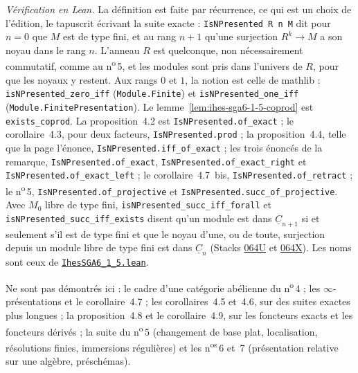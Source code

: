 \noindent\emph{Vérification en Lean.} La définition est faite par récurrence, ce qui est un choix de l'édition, le tapuscrit écrivant la suite exacte : \texttt{IsNPresented R n M} dit pour $n = 0$ que $M$ est de type fini, et au rang $n + 1$ qu'une surjection $R^k \to M$ a son noyau dans le rang $n$. L'anneau $R$ est quelconque, non nécessairement commutatif, comme au n\textsuperscript{o}\,5, et les modules sont pris dans l'univers de $R$, pour que les noyaux y restent. Aux rangs $0$ et $1$, la notion est celle de mathlib : \texttt{isNPresented\_zero\_iff} (\texttt{Module.Finite}) et \texttt{isNPresented\_one\_iff} (\texttt{Module.FinitePresentation}). Le lemme~\ref{lem:ihes-sga6-1-5-coprod} est \texttt{exists\_coprod}. La proposition~4.2 est \texttt{IsNPresented.of\_exact} ; le corollaire~4.3, pour deux facteurs, \texttt{IsNPresented.prod} ; la proposition~4.4, telle que la page l'énonce, \texttt{IsNPresented.iff\_of\_exact} ; les trois énoncés de la remarque, \texttt{IsNPresented.of\_exact}, \texttt{IsNPresented.of\_exact\_right} et \texttt{IsNPresented.of\_exact\_left} ; le corollaire~4.7~bis, \texttt{IsNPresented.of\_retract} ; le n\textsuperscript{o}\,5, \texttt{IsNPresented.of\_projective} et \texttt{IsNPresented.succ\_of\_projective}. Avec $M_0$ libre de type fini, \texttt{isNPresented\_succ\_iff\_forall} et \texttt{isNPresented\_succ\_iff\_exists} disent qu'un module est dans $\underline C_{n+1}$ si et seulement s'il est de type fini et que le noyau d'une, ou de toute, surjection depuis un module libre de type fini est dans $\underline C_n$ (Stacks \href{https://stacks.math.columbia.edu/tag/064U}{064U} et \href{https://stacks.math.columbia.edu/tag/064X}{064X}). Les noms sont ceux de \href{\leanblobmain/CategoryTheory/IhesSGA6_1_5.lean}{\texttt{IhesSGA6\_1\_5.\allowbreak{}lean}}.

Ne sont pas démontrés ici : le cadre d'une catégorie abélienne du n\textsuperscript{o}\,4 ; les $\infty$-présentations et le corollaire~4.7 ; les corollaires~4.5 et~4.6, sur des suites exactes plus longues ; la proposition~4.8 et le corollaire~4.9, sur les foncteurs exacts et les foncteurs dérivés ; la suite du n\textsuperscript{o}\,5 (changement de base plat, localisation, résolutions finies, immersions régulières) et les n\textsuperscript{os}\,6 et~7 (présentation relative sur une algèbre, préschémas).
